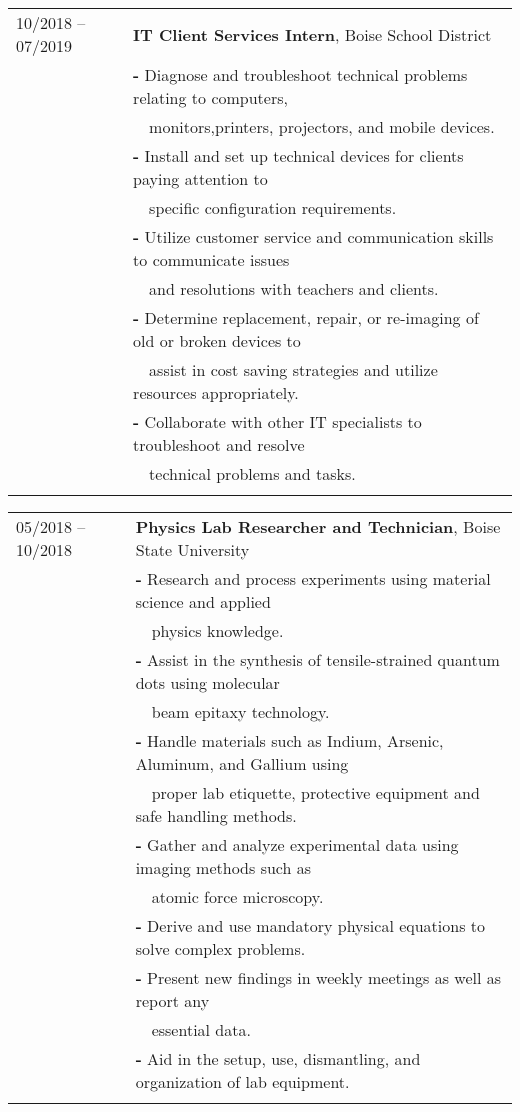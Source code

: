 \documentclass[a4paper,12pt]{article}
\begin{document}
\begin{tabular}{ll}
10/2018 -- 07/2019 & \textbf{IT Client Services Intern}, Boise School District\\
         & \textbf{-} Diagnose and troubleshoot technical problems relating to computers,\\ 
         & \-\ \-\  monitors,printers, projectors, and mobile devices. \\
         & \textbf{-} Install and set up technical devices for clients paying attention to\\ 
         & \-\ \-\ specific configuration requirements. \\
         & \textbf{-} Utilize customer service and communication skills to communicate issues\\ 
         & \-\ \-\ and resolutions with teachers and clients.\\
         & \textbf{-} Determine replacement, repair, or re-imaging of old or broken devices to\\ 
         & \-\ \-\ assist in cost saving strategies and utilize resources appropriately. \\
         & \textbf{-} Collaborate with other IT specialists to troubleshoot and resolve\\
         & \-\ \-\ technical problems and tasks.\\
         \\
\end{tabular}

\begin{tabular}{ll}
05/2018 -- 10/2018  & \textbf{Physics Lab Researcher and Technician}, Boise State University\\
         & \textbf{-} Research and process experiments using material science and applied\\
         & \-\ \-\ physics knowledge.\\
         & \textbf{-} Assist in the synthesis of tensile-strained quantum dots using molecular\\
         & \-\ \-\ beam epitaxy technology.\\
         & \textbf{-} Handle materials such as Indium, Arsenic, Aluminum, and Gallium using\\
         & \-\ \-\ proper lab etiquette, protective equipment and safe handling methods. \\
         & \textbf{-} Gather and analyze experimental data using imaging methods such as\\
         & \-\ \-\ atomic force microscopy. \\
         & \textbf{-} Derive and use mandatory physical equations to solve complex problems. \\
         & \textbf{-} Present new findings in weekly meetings as well as report any\\
         & \-\ \-\ essential data. \\
         & \textbf{-} Aid in the setup, use, dismantling, and organization of lab equipment. \\
         \\
    
\end{tabular}
\end{document}
